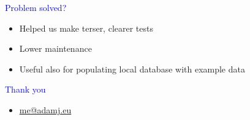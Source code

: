\documentclass[landscape]{slides}
\begin{document}
\begin{slide}
    \textcolor{blue}{\Large{Problem solved?}}

    \begin{itemize}
        \item Helped us make terser, clearer tests
        \item Lower maintenance
        \item Useful also for populating local database with example data
    \end{itemize}
\end{slide}


\begin{slide}
    \textcolor{blue}{\Large{Thank you}}

    \begin{itemize}
        \item \url{me@adamj.eu}
    \end{itemize}
\end{slide}
\end{document}
